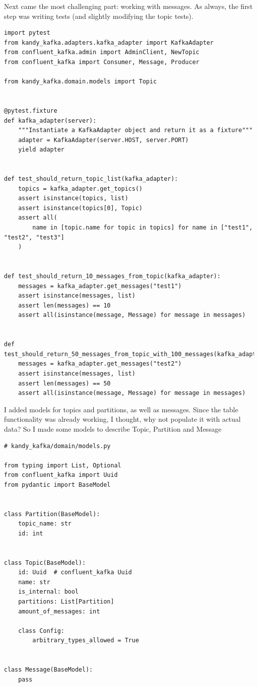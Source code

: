 \documentclass[10pt , a4paper]{report}
\newenvironment{code}{\captionsetup{type=listing}}{}
\begin{document}
Next came the most challenging part: working with messages. As always, the first step was writing tests (and slightly modifying the topic tests).

\begin{code}
  \begin{verbatim}
import pytest
from kandy_kafka.adapters.kafka_adapter import KafkaAdapter
from confluent_kafka.admin import AdminClient, NewTopic
from confluent_kafka import Consumer, Message, Producer

from kandy_kafka.domain.models import Topic


@pytest.fixture
def kafka_adapter(server):
    """Instantiate a KafkaAdapter object and return it as a fixture"""
    adapter = KafkaAdapter(server.HOST, server.PORT)
    yield adapter


def test_should_return_topic_list(kafka_adapter):
    topics = kafka_adapter.get_topics()
    assert isinstance(topics, list)
    assert isinstance(topics[0], Topic)
    assert all(
        name in [topic.name for topic in topics] for name in ["test1", "test2", "test3"]
    )


def test_should_return_10_messages_from_topic(kafka_adapter):
    messages = kafka_adapter.get_messages("test1")
    assert isinstance(messages, list)
    assert len(messages) == 10
    assert all(isinstance(message, Message) for message in messages)


def test_should_return_50_messages_from_topic_with_100_messages(kafka_adapter):
    messages = kafka_adapter.get_messages("test2")
    assert isinstance(messages, list)
    assert len(messages) == 50
    assert all(isinstance(message, Message) for message in messages)
  \end{verbatim}
\end{code}

I added models for topics and partitions, as well as messages. Since the table functionality was already working, I thought, why not populate it with actual data? So I made some models to describe Topic, Partition and Message

\begin{code}
  \begin{verbatim}
# kandy_kafka/domain/models.py

from typing import List, Optional
from confluent_kafka import Uuid
from pydantic import BaseModel


class Partition(BaseModel):
    topic_name: str
    id: int


class Topic(BaseModel):
    id: Uuid  # confluent_kafka Uuid
    name: str
    is_internal: bool
    partitions: List[Partition]
    amount_of_messages: int

    class Config:
        arbitrary_types_allowed = True


class Message(BaseModel):
    pass
  \end{verbatim}
\end{code}
\end{document}
